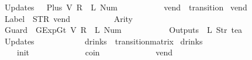 \begin{isabellebody}
{\ \ \ \ \ \ \ \ \ \ Updates\ {\isacharequal}\ {\isacharbrackleft}{\isacharparenleft}{}{\isacharcomma}\ {\isacharparenleft}Plus\ {\isacharparenleft}V\ {\isacharparenleft}R\ {}{\isacharparenright}{\isacharparenright}\ {\isacharparenleft}L\ {\isacharparenleft}Num\ {}{\isacharparenright}{\isacharparenright}{\isacharparenright}{\isacharparenright}{\isacharbrackright}\isanewline
\ \ \ \ \ \ \ \ {\isasymrparr}{\isachardoublequoteclose}\isanewline
\isanewline
{}\isamarkupfalse%
\ vend\ {\isacharcolon}{\isacharcolon}\ transition\ \isanewline
{\isachardoublequoteopen}vend\ {\isasymequiv}\ {\isasymlparr}\isanewline
\ \ \ \ \ \ \ \ \ \ Label\ {\isacharequal}\ {\isacharparenleft}STR\ {\isacharprime}{\isacharprime}vend{\isacharprime}{\isacharprime}{\isacharparenright}{\isacharcomma}\isanewline
\ \ \ \ \ \ \ \ \ \ Arity\ {\isacharequal}\ {}{\isacharcomma}\isanewline
\ \ \ \ \ \ \ \ \ \ Guard\ {\isacharequal}\ {\isacharbrackleft}GExp{\isachardot}Gt\ {\isacharparenleft}V\ {\isacharparenleft}R\ {}{\isacharparenright}{\isacharparenright}\ {\isacharparenleft}L\ {\isacharparenleft}Num\ {}{\isacharparenright}{\isacharparenright}{\isacharbrackright}{\isacharcomma}\isanewline
\ \ \ \ \ \ \ \ \ \ Outputs\ {\isacharequal}\ {\isacharbrackleft}L\ {\isacharparenleft}Str\ {\isacharprime}{\isacharprime}tea{\isacharprime}{\isacharprime}{\isacharparenright}{\isacharbrackright}{\isacharcomma}\isanewline
\ \ \ \ \ \ \ \ \ \ Updates\ {\isacharequal}\ {\isacharbrackleft}{\isacharbrackright}\isanewline
\ \ \ \ \ \ \ \ {\isasymrparr}{\isachardoublequoteclose}\isanewline
\isanewline
{}\isamarkupfalse%
\ drinks\ {\isacharcolon}{\isacharcolon}\ {\isachardoublequoteopen}transition{\isacharunderscore}matrix{\isachardoublequoteclose}\ \isanewline
{\isachardoublequoteopen}drinks\ {\isasymequiv}\ {\isacharbraceleft}{\isacharbar}\isanewline
\ \ \ \ \ \ \ \ \ \ \ \ {\isacharparenleft}{\isacharparenleft}{}{\isacharcomma}{}{\isacharparenright}{\isacharcomma}\ init{\isacharparenright}{\isacharcomma}\isanewline
\ \ \ \ \ \ \ \ \ \ \ \ {\isacharparenleft}{\isacharparenleft}{}{\isacharcomma}{}{\isacharparenright}{\isacharcomma}\ coin{\isacharparenright}{\isacharcomma}\isanewline
\ \ \ \ \ \ \ \ \ \ \ \ {\isacharparenleft}{\isacharparenleft}{}{\isacharcomma}{}{\isacharparenright}{\isacharcomma}\ vend{\isacharparenright}\isanewline
\ \ \ \ \ \ \ \ \ \ {\isacharbar}{\isacharbraceright}{\isachardoublequoteclose}%
}
\end{isabellebody}
